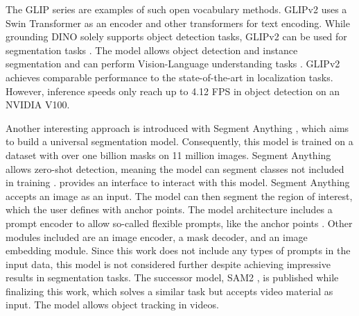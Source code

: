 \noindent The GLIP series \cite{GLIPv12022} \cite{glipv22022} are examples of such open vocabulary methods.
GLIPv2 uses a Swin Transformer \cite{swinTransformer2021} as an encoder and other transformers for text encoding.
While grounding DINO solely supports object detection tasks, GLIPv2 can be used for segmentation tasks \cite{groundingdino2024}.
The model allows object detection and instance segmentation and can perform Vision-Language understanding tasks \cite{glipv22022}.
GLIPv2 achieves comparable performance to the state-of-the-art in localization tasks.
However, inference speeds only reach up to 4.12 \ac{FPS} in object detection on an NVIDIA V100.

\vspace{0.5cm}

\noindent Another interesting approach is introduced with Segment Anything \cite{segmentAnything2023}, which aims to build a universal segmentation model.
Consequently, this model is trained on a dataset with over one billion masks on 11 million images.
Segment Anything \cite{segmentAnything2023} allows zero-shot detection, meaning the model can segment classes not included in training \cite{segmentAnything2023} \cite{openvocabularysurvey2024}.
\cite{segmentAnythingOnline} provides an interface to interact with this model.
Segment Anything accepts an image as an input.
The model can then segment the region of interest, which the user defines with anchor points.
The model architecture includes a prompt encoder to allow so-called flexible prompts, like the anchor points \cite{segmentAnything2023}.
Other modules included are an image encoder, a mask decoder, and an image embedding module.
Since this work does not include any types of prompts in the input data, this model is not considered further despite achieving impressive results in segmentation tasks.
The successor model, \ac{SAM2} \cite{segmentAnything22024}, is published while finalizing this work, which solves a similar task but accepts video material as input.
The model allows object tracking in videos.

